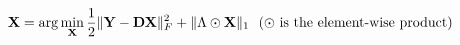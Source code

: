 \documentclass{standalone}
\begin{document}
$ \displaystyle
\mathbf{X} = \arg\min_{\mathbf{X}} \frac{1}{2} \|\mathbf{Y} - \mathbf{D} \mathbf{X}\|_F^2 + \|\Lambda \odot\mathbf{X}\|_1 ~~ (\odot~ \text{is the element-wise product})
$
\end{document}
